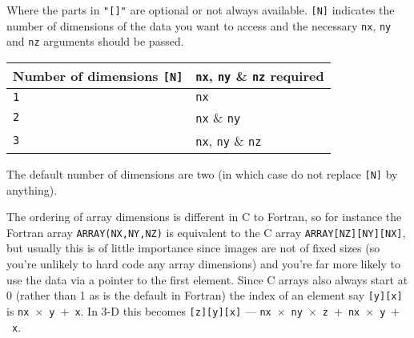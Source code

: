 \documentclass[twoside,11pt]{article}
\renewcommand{\_}{\texttt{\symbol{95}}}
\newcommand{\myverb}[1]{{\texttt{#1}}}
\begin{document}
Where the parts in \texttt{"[]"} are optional or not always available.
\texttt{[N]} indicates the number of dimensions of the data you want to access
and the necessary \texttt{nx}, \texttt{ny} and \texttt{nz} arguments should
be passed.
\begin{small}
\begin{center}
\begin{tabular}{||l|l||}
\hline
Number of dimensions \texttt{[N]}    &    \texttt{nx}, \texttt{ny} \& \texttt{nz} required \\
\hline
     \texttt{1}                      &    \texttt{nx}       \\
     \texttt{2}                      &    \texttt{nx} \& \texttt{ny} \\
     \texttt{3}                      &    \texttt{nx}, \texttt{ny} \& \texttt{nz} \\
\hline
\end{tabular}
\end{center}
\end{small}
The default number of dimensions are two (in which case do not replace
\texttt{[N]} by anything). 

The ordering of array dimensions is different in C to Fortran, so for
instance the Fortran array \myverb{ARRAY(NX,NY,NZ)} is equivalent to
the C array \myverb{ARRAY[NZ][NY][NX]}, but usually this is of little
importance since images are not of fixed sizes (so you're unlikely to
hard code any array dimensions) and you're far more likely to use the
data via a pointer to the first element. Since C arrays also always start
at 0 (rather than 1 as is the default in Fortran) the index of an
element say \texttt{[y][x]} is
\texttt{nx}~$\times$~\texttt{y}~$+$~\texttt{x}. In 3-D this becomes 
\texttt{[z][y][x]} --- 
\texttt{nx}~$\times$~\texttt{ny}~$\times$~\texttt{z}~$+$~\texttt{nx}~$\times$~\texttt{y}~$+$~\texttt{x}.
\end{document}
